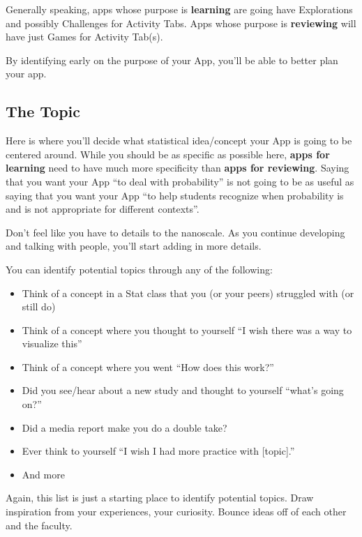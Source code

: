 \documentclass[
]{book}
\providecommand{\tightlist}{%
  \setlength{\itemsep}{0pt}\setlength{\parskip}{0pt}}
\begin{document}
Generally speaking, apps whose purpose is \textbf{learning} are going have Explorations and possibly Challenges for Activity Tabs. Apps whose purpose is \textbf{reviewing} will have just Games for Activity Tab(s).

By identifying early on the purpose of your App, you'll be able to better plan your app.

\hypertarget{step2b}{%
\subsection{The Topic}\label{step2b}}

Here is where you'll decide what statistical idea/concept your App is going to be centered around. While you should be as specific as possible here, \textbf{apps for learning} need to have much more specificity than \textbf{apps for reviewing}. Saying that you want your App ``to deal with probability'' is not going to be as useful as saying that you want your App ``to help students recognize when probability is and is not appropriate for different contexts''.

Don't feel like you have to details to the nanoscale. As you continue developing and talking with people, you'll start adding in more details.

You can identify potential topics through any of the following:

\begin{itemize}
\tightlist
\item
  Think of a concept in a Stat class that you (or your peers) struggled with (or still do)
\item
  Think of a concept where you thought to yourself ``I wish there was a way to visualize this''
\item
  Think of a concept where you went ``How does this work?''
\item
  Did you see/hear about a new study and thought to yourself ``what's going on?''
\item
  Did a media report make you do a double take?
\item
  Ever think to yourself ``I wish I had more practice with {[}topic{]}.''
\item
  And more
\end{itemize}

Again, this list is just a starting place to identify potential topics. Draw inspiration from your experiences, your curiosity. Bounce ideas off of each other and the faculty.
\end{document}
